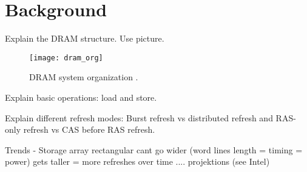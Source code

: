 \section{Background} 
\label{sec:bg}

Explain the DRAM structure. Use picture.


\begin{figure*}[t!]
	\center
	\texttt{[image: dram\_org]}
	\caption{DRAM system organization \cite{raidr}.}
	\label{fig:dram_org}
\end{figure*}

Explain basic operations: load and store.

Explain different refresh modes: Burst refresh vs distributed refresh and RAS-only refresh vs CAS before RAS refresh.

Trends - Storage array rectangular
            cant go wider (word lines length = timing = power)
            gets taller = more refreshes
            over time .... projektions (see Intel)
